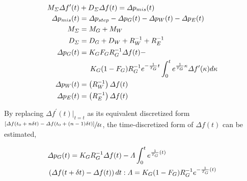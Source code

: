 \documentclass[lettersize,journal]{IEEEtran}
\newenvironment{newsubequations}{\small\begin{subequations}}{\end{subequations}}
\begin{document}
\begin{newsubequations}\label{eqn:2}
	\begin{align}
		M_{\varSigma } \varDelta f^{\prime}(t) & +D_{\varSigma} \varDelta f(t)=\varDelta p_{mis}(t)                                                                                        \\
		\varDelta p_{mis}(t)                         & =\varDelta p_{step}-\varDelta p_{G}(t)-\varDelta p_{W}(t)-\varDelta p_{E}(t)                                                        \\
		M_{\varSigma}                          & =M_{G}+M_{W}                                                                                                                        \\
		D_{\varSigma}                          & =D_{G}+D_{W}+{ R_{W}^{-1} } + { R_{E}^{-1}}                                                                                         \\
		\varDelta p_{G}(t)                     & ={K_{G} F_{G}}{ R_{G}^{-1}} \varDelta f(t)- \notag                                                                                  \\
		                                       & \quad\,\,\, {K_G(1-F_G)}{ R_{G}^{-1} }e^{-\frac{1}{T_G}t} \int_{0}^{t}e^{\frac{1}{T_G}\kappa} \varDelta f^{\prime}(\kappa) d \kappa \\
		\varDelta p_{W}(t)                     & =\left({R_{W}^{-1}}\right) \varDelta f(t)                                                                                           \\
		\varDelta p_{E}(t)                     & =\left( { R_{E}^{-1}}\right) \varDelta f(t)
	\end{align}
\end{newsubequations}

By replacing $\varDelta f^{\prime}(t)|_{t = t}$ as its equivalent discretized form $\sfrac{[\varDelta f(t_0+ n\delta t)-\varDelta f(t_0 + (n-1)\delta t)]}{ \delta t}$, the time-discretized form of $\varDelta f(t)$ can be estimated,

\begin{newsubequations}\label{eqn:3}
	\begin{align}
		 & \varDelta p_{G}(t)={K_{G} }{ R_{G}^{-1}} \varDelta f(t) - \varLambda \int_{0}^{t} e^{\frac{1}{T_G}(t)} \label{time-discretized SFR: additional power from convertional units} \\
		 & \left(\varDelta f(t+\delta t) - \varDelta f(t) \right) d t: \varLambda = {K_G(1-F_G)}{ R_{G}^{-1} }e^{-\frac{1}{T_G} (t)} \notag                                              \\
	\end{align}
\end{newsubequations}
\end{document}
